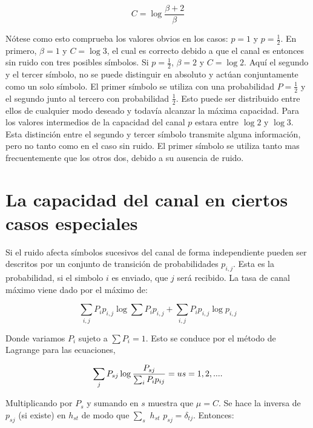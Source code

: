 \begin{equation}
  C = \log{\frac{\beta + 2}{\beta}}
\end{equation}

N\'{o}tese como esto comprueba los valores obvios en los casos: $p =
1$ y $p = \frac{1}{2}$. En primero, $\beta = 1$ y $C = \log{3}$, el
cual es correcto debido a que el canal es entonces sin ruido con tres
posibles s\'imbolos. Si $p = \frac{1}{2}$, $\beta = 2$ y $C
= \log{2}$. Aqu\'i el segundo y el tercer s\'imbolo, no se puede
distinguir en absoluto y act\'uan conjuntamente como un solo
s\'imbolo. El primer s\'imbolo se utiliza con una probabilidad $P
= \frac{1}{2}$ y el segundo junto al tercero con probabilidad
$\frac{1}{2}$. Esto puede ser distribuido entre ellos de cualquier
modo deseado y todav\'ia alcanzar la m\'axima capacidad.  Para los
valores intermedios de la capacidad del canal $p$ estara entre
$\log{2}$ y $\log{3}$. Esta distinci\'on entre el segundo y tercer
s\'imbolo transmite alguna informaci\'on, pero no tanto como en el
caso sin ruido.  El primer s\'imbolo se utiliza tanto mas
frecuentemente que los otros dos, debido a su ausencia de ruido.

\clearpage

\chapter{La capacidad del canal en ciertos casos especiales}
\label{sec:16}

Si el ruido afecta s\'imbolos sucesivos del canal de forma
independiente pueden ser descritos por un conjunto de transici\'on de
probabilidades $p_{i,j}$. Esta es la probabilidad, si el simbolo $i$ es
enviado, que $j$ ser\'{a} recibido. La tasa de canal m\'aximo viene dado
por el m\'aximo de:

\begin{equation}
  \sum_{i,j}P_i p_{i,j} \log{\sum{P_i p_{i,j}}} + \sum_{i,j}P_i p_{i,j}\log{p_{i,j}}
\end{equation}
 
Donde variamos $P_i$ sujeto a $ \sum P_i = 1$. Esto se conduce por el m\'etodo de Lagrange para las ecuaciones,

\begin{equation}
\sum_{j}P_{sj} \log{\frac{P_{sj}}{\sum_{i} P_i p_{ij} }} = u \\
s = 1,2,....
\end{equation}

Multiplicando por $P_s$ y sumando en $s$ muestra que $\mu = C$. Se hace la inversa de $p_{sj}$ (si existe) en $h_{st}$  de modo que 
$\sum_{s}$ $h_{st}$ $p_{sj} = \delta_{tj}$. Entonces: 

